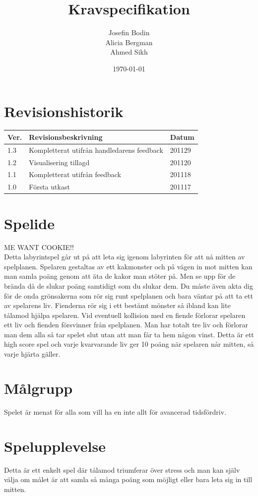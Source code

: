 \documentclass{TDP005mall}
\author{Josefin Bodin\\
  Alicia Bergman \\
Ahmed Sikh}
\title{Kravspecifikation}
\date{\today}
\begin{document}
\projectpage
\section{Revisionshistorik}
\begin{table}[!h]
\begin{tabularx}{\linewidth}{|l|X|l|}
\hline
Ver. & Revisionsbeskrivning & Datum \\\hline
1.3 & Kompletterat utifrån handledarens feedback & 201129 \\\hline
1.2 & Visualisering tillagd & 201120 \\\hline
1.1 & Kompletterat utifrån feedback & 201118 \\\hline
1.0 & Första utkast & 201117 \\\hline
\end{tabularx}
\end{table}

\label{prereq}
\section{Spelide}
ME WANT COOKIE!!\\
Detta labyrintspel går ut på att leta sig igenom labyrinten för att nå mitten av
spelplanen. Spelaren gestaltas av ett kakmonster och på vägen in mot mitten kan man
samla poäng genom att äta de kakor man stöter på. Men se upp för de brända då de
slukar poäng samtidigt som du slukar dem. Du måste även akta dig för de onda
grönsakerna som rör sig runt spelplanen och bara väntar på att ta ett av
spelarens liv. Fienderna rör sig i ett bestämt mönster så ibland kan lite
tålamod hjälpa spelaren. Vid eventuell kollision med en fiende förlorar spelaren
ett liv och fienden försvinner från spelplanen. Man har totalt tre liv och
förlorar man dem alla så tar spelet slut utan att man får ta hem någon
vinst. Detta är ett high score spel och varje kvarvarande liv ger 10 poäng när
spelaren når mitten, så varje hjärta gäller.


\section{Målgrupp}
Spelet är menat för alla som vill ha en inte allt för avancerad tidsfördriv. 

\section{Spelupplevelse}
Detta är ett enkelt spel där tålamod triumferar över stress och man kan själv
välja om målet är att samla så många poäng som möjligt eller bara leta sig in
till mitten.
\end{document}
